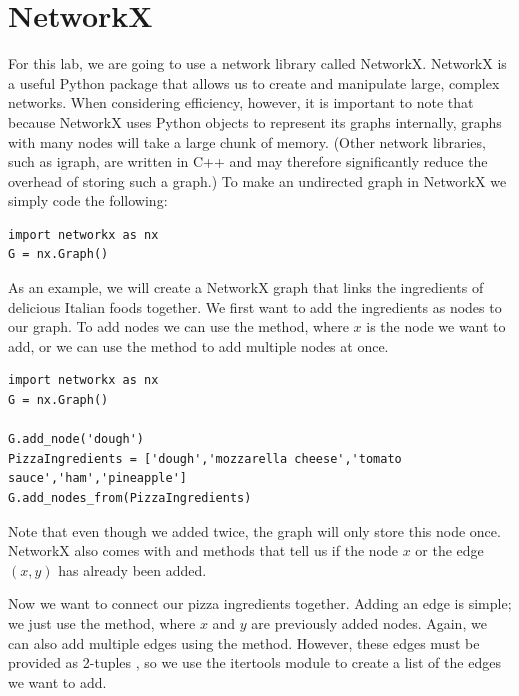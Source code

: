 \section*{NetworkX}
For this lab, we are going to use a network library called NetworkX. NetworkX is a useful Python package that allows us to create and manipulate large, complex networks.
When considering efficiency, however, it is important to note that because NetworkX uses Python objects to represent its graphs internally, graphs with many nodes will
take a large chunk of memory. (Other network libraries, such as igraph, are written in C++ and may therefore significantly reduce the overhead of storing such a graph.)
To make an undirected graph in NetworkX we simply code the following:

\begin{lstlisting}
import networkx as nx
G = nx.Graph()
\end{lstlisting}

As an example, we will create a NetworkX graph that links the ingredients of 
delicious Italian foods together. We first want to add the ingredients as nodes 
to our graph. To add nodes we can use the  method, where $x$ 
is the node we want to add, or we can use the  method to 
add multiple nodes at once.

\begin{lstlisting}
import networkx as nx
G = nx.Graph()

G.add_node('dough')
PizzaIngredients = ['dough','mozzarella cheese','tomato sauce','ham','pineapple']
G.add_nodes_from(PizzaIngredients)
\end{lstlisting}
Note that even though we added  twice, the graph will only store this node once. NetworkX also comes with  and  methods that tell
us if the node $x$ or the edge $(x,y)$ has already been added.

Now we want to connect our pizza ingredients together. Adding an edge is simple; we just use the  method, where $x$ and $y$ are previously added nodes.
Again, we can also add multiple edges using the  method. However, these edges must be provided as 2-tuples , so we use the itertools module to create a list of the edges we want to add.

